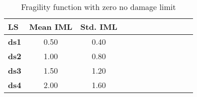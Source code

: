 \begin{table}[htbp]

\centering
\begin{tabular}{ l c c c c c c c c c c c}

\hline
\rowcolor{anti-flashwhite}
\bf{LS} & \bf{Mean IML} & \bf{Std. IML} \\
\hline
\bf{ds1} & 0.50 & 0.40 \\
\bf{ds2} & 1.00 & 0.80 \\
\bf{ds3} & 1.50 & 1.20 \\
\bf{ds4} & 2.00 & 1.60 \\
\hline
\end{tabular}

\caption{Fragility function with zero no damage limit}
\label{tab:ff-cont-tax1-zmin}
\end{table}